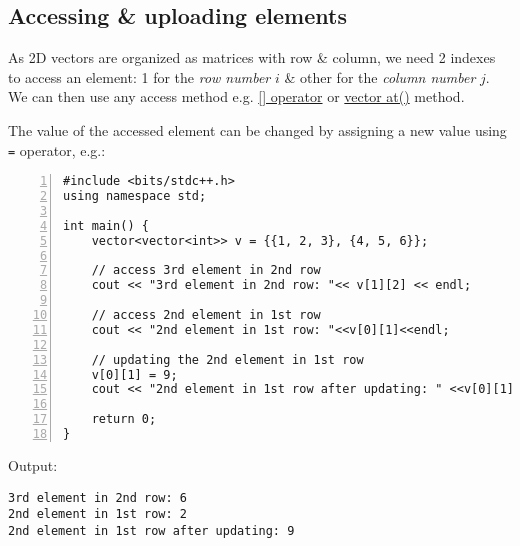 \documentclass{article}
\begin{document}
\subsection{Accessing \& uploading elements}
As 2D vectors are organized as matrices with row \& column, we need 2 indexes to access an element: 1 for the {\it row number} $i$ \& other for the {\it column number} $j$. We can then use any access method e.g. \href{https://www.geeksforgeeks.org/vectoroperator-vectoroperator-c-stl/}{[] operator} or \href{https://www.geeksforgeeks.org/vector-at-in-cpp-stl/}{vector at()} method.

The value of the accessed element can be changed by assigning a new value using {\tt=} operator, e.g.:
\begin{Verbatim}[numbers=left,xleftmargin=5mm]
#include <bits/stdc++.h>
using namespace std;

int main() {
    vector<vector<int>> v = {{1, 2, 3}, {4, 5, 6}};
	
    // access 3rd element in 2nd row
    cout << "3rd element in 2nd row: "<< v[1][2] << endl;
	
    // access 2nd element in 1st row
    cout << "2nd element in 1st row: "<<v[0][1]<<endl;
	
    // updating the 2nd element in 1st row
    v[0][1] = 9; 
    cout << "2nd element in 1st row after updating: " <<v[0][1]<<endl;

    return 0;
}
\end{Verbatim}
Output:
\begin{verbatim}
3rd element in 2nd row: 6
2nd element in 1st row: 2
2nd element in 1st row after updating: 9
\end{verbatim}

\end{document}

